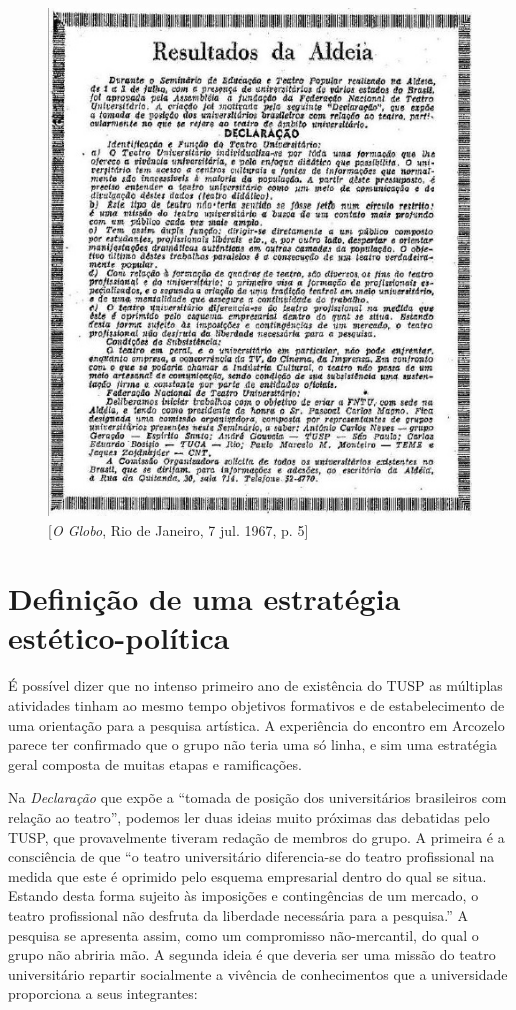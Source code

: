 \begin{figure}
\includegraphics[width=\columnwidth]{./media/IMAGEM5.jpg}
\caption{{[}\textit{O Globo}, Rio de Janeiro, 7 jul. 1967, p. 5{]}}
\end{figure}

\section{Definição de uma estratégia estético-política}

É possível dizer que no intenso primeiro ano de existência do TUSP as
múltiplas atividades tinham ao mesmo tempo objetivos formativos e de
estabelecimento de uma orientação para a pesquisa artística. A
experiência do encontro em Arcozelo parece ter confirmado que o grupo
não teria uma só linha, e sim uma estratégia geral composta de muitas
etapas e ramificações.

Na \textit{Declaração} que expõe a “tomada de posição dos universitários
brasileiros com relação ao teatro”, podemos ler duas ideias muito
próximas das debatidas pelo TUSP, que provavelmente tiveram redação de
membros do grupo. A primeira é a consciência de que “o teatro
universitário diferencia-se do teatro profissional na medida que este é
oprimido pelo esquema empresarial dentro do qual se situa. Estando desta
forma sujeito às imposições e contingências de um mercado, o teatro
profissional não desfruta da liberdade necessária para a pesquisa.” A
pesquisa se apresenta assim, como um compromisso não-mercantil, do qual
o grupo não abriria mão. A segunda ideia é que deveria ser uma missão do
teatro universitário repartir socialmente a vivência de conhecimentos
que a universidade proporciona a seus integrantes:

